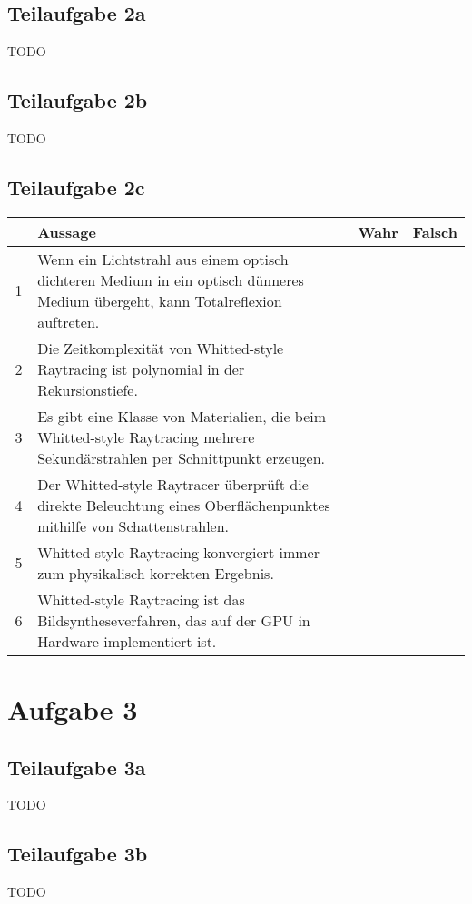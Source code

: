 \documentclass[a4paper]{scrartcl}
\begin{document}
\subsection*{Teilaufgabe 2a}
TODO

\subsection*{Teilaufgabe 2b}
TODO

\subsection*{Teilaufgabe 2c}
\begin{tabular}{cp{12cm}ll}\toprule
	~ & \textbf{Aussage} & \textbf{Wahr} & \textbf{Falsch} \\\midrule
	1 & Wenn ein Lichtstrahl aus einem optisch dichteren Medium in ein optisch dünneres Medium übergeht, kann Totalreflexion auftreten.
	  & \CheckedBox & \Square     \\
	2 & Die Zeitkomplexität von Whitted-style Raytracing ist polynomial in der Rekursionstiefe.
	  & \Square     & \CheckedBox \\
	3 & Es gibt eine Klasse von Materialien, die beim Whitted-style Raytracing mehrere Sekundärstrahlen per Schnittpunkt erzeugen.
	  & \CheckedBox & \Square     \\
	4 & Der Whitted-style Raytracer überprüft die direkte Beleuchtung eines Oberflächenpunktes mithilfe von Schattenstrahlen.
	  & \CheckedBox & \Square     \\
	5 & Whitted-style Raytracing konvergiert immer zum physikalisch korrekten Ergebnis.
	  & \Square     & \CheckedBox \\
	6 & Whitted-style Raytracing ist das Bildsyntheseverfahren, das auf der GPU in Hardware implementiert ist.
	  & \Square     & \CheckedBox \\\bottomrule
\end{tabular}

\section*{Aufgabe 3}
\subsection*{Teilaufgabe 3a}
TODO

\subsection*{Teilaufgabe 3b}
TODO
\end{document}
